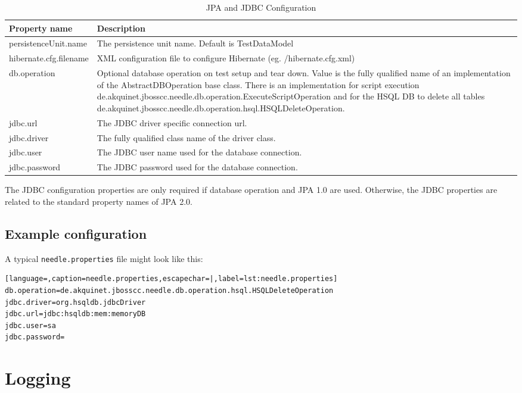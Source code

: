 \begin{table}[H]
\centering
\begin{tabular}{p{6cm}p{11cm}} \toprule
    \textbf{Property name} & \textbf{Description} \\ \midrule
    persistenceUnit.name & The persistence unit name. Default is TestDataModel  \\
    hibernate.cfg.filename & XML configuration file to configure Hibernate (eg. /hibernate.cfg.xml)  \\
    db.operation & Optional database operation on test setup and tear down. Value is the fully qualified name of an implementation of the AbstractDBOperation base class.
There is an implementation for script execution de.akquinet.jbosscc.needle.db.operation.\-ExecuteScriptOperation and for the  HSQL DB to delete all tables de.akquinet.jbosscc.needle.db.operation.hsql.\-HSQLDeleteOperation.    \\
    jdbc.url & The JDBC driver specific connection url.  \\
    jdbc.driver & The fully qualified class name of the driver class.  \\
    jdbc.user &  The JDBC user name used for the database connection.  \\
    jdbc.password & The JDBC password used for the database connection.  \\
\bottomrule
\end{tabular}
\caption{JPA and JDBC Configuration}
\end{table}

The JDBC configuration properties are only required if database operation and JPA 1.0 are used.
Otherwise, the JDBC properties are related to the standard property names of JPA 2.0.

\subsection{Example configuration}

A typical \verb|needle.properties| file might look like this:

\begin{lstlisting}[language=,caption=needle.properties,escapechar=|,label=lst:needle.properties]
db.operation=de.akquinet.jbosscc.needle.db.operation.hsql.HSQLDeleteOperation
jdbc.driver=org.hsqldb.jdbcDriver
jdbc.url=jdbc:hsqldb:mem:memoryDB
jdbc.user=sa
jdbc.password=
\end{lstlisting}

\section{Logging}

